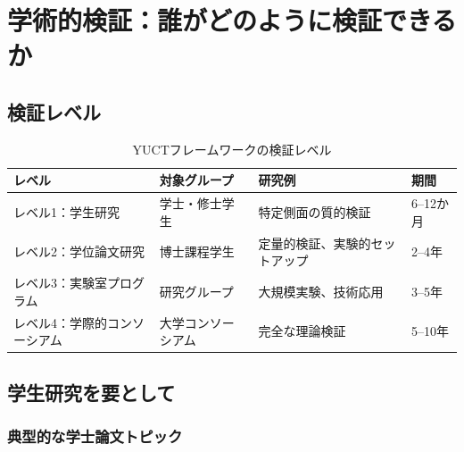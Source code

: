 \documentclass[12pt,a4paper]{article}
\begin{document}
	\section{学術的検証：誰がどのように検証できるか}
	
	\subsection{検証レベル}
	
	\begin{table}[h]
		\centering
		\begin{tabular}{p{}p{}p{}p{}}
			\toprule
			\textbf{レベル} & \textbf{対象グループ} & \textbf{研究例} & \textbf{期間} \\
			\midrule
			レベル1：学生研究 & 学士・修士学生 & 特定側面の質的検証 & 6–12か月 \\
			レベル2：学位論文研究 & 博士課程学生 & 定量的検証、実験的セットアップ & 2–4年 \\
			レベル3：実験室プログラム & 研究グループ & 大規模実験、技術応用 & 3–5年 \\
			レベル4：学際的コンソーシアム & 大学コンソーシアム & 完全な理論検証 & 5–10年 \\
			\bottomrule
		\end{tabular}
		\caption{YUCTフレームワークの検証レベル}
		\label{tab:verification-levels}
	\end{table}
	
	\subsection{学生研究を要として}
	
	\subsubsection{典型的な学士論文トピック}
	
\end{document}
